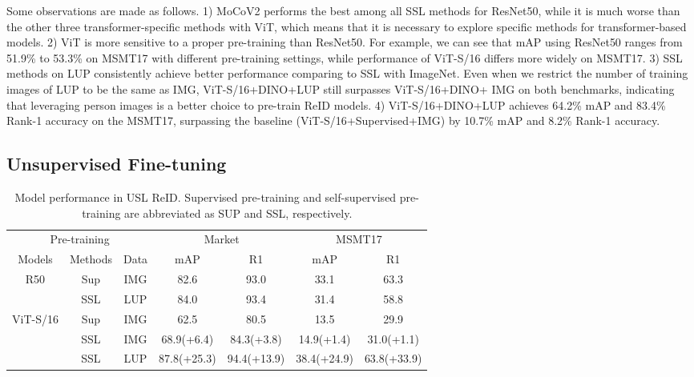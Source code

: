 \documentclass[10pt,twocolumn,letterpaper]{article}
\begin{document}
Some observations are made as follows. 1) MoCoV2 performs the best among all SSL methods for ResNet50, while it is much worse than the other three transformer-specific methods with ViT, which means that it is necessary to explore specific methods for transformer-based models. 2) ViT is more sensitive to a proper pre-training than ResNet50. For example, we can see that mAP using ResNet50 ranges from 51.9\% to 53.3\% on MSMT17 with different pre-training settings, while performance of ViT-S/16 differs more widely on MSMT17. 3) SSL methods on LUP consistently achieve better performance comparing to SSL with ImageNet. Even when we restrict the number of training images of LUP to be the same as IMG,  ViT-S/16+DINO+LUP still surpasses ViT-S/16+DINO+
IMG on both benchmarks, indicating that leveraging person images is a better choice to pre-train ReID models. 4) ViT-S/16+DINO+LUP achieves 64.2\% mAP and 83.4\% Rank-1 accuracy on the MSMT17, surpassing the baseline (ViT-S/16+Supervised+IMG) by 10.7\% mAP and 8.2\% Rank-1 accuracy.

\subsection{Unsupervised Fine-tuning}

\renewcommand{\multirowsetup}{\centering}
\begin{table}[htb]\footnotesize
    \begin{center}
    \setlength\tabcolsep{2pt}
    \begin{tabular}{ccc|cc|cc}
    \hline
     \multicolumn{3}{c|}{Pre-training}  & \multicolumn{2}{c|}{Market}  & \multicolumn{2}{c}{MSMT17}\\
    Models & Methods &Data & mAP & R1 & mAP & R1\\
    \hline
    \multirow{2}{*}{R50}& Sup &IMG &82.6 &93.0 &33.1 &63.3 \\
    & SSL &LUP &84.0 &93.4 &31.4 &58.8\\
    \hline
    \multirow{3}{*}{ViT-S/16}& Sup &IMG &62.5 &80.5 &13.5 &29.9 \\
    & SSL &IMG  &68.9{\color{gray}(+6.4)} &84.3{\color{gray}(+3.8)} &14.9{\color{gray}(+1.4)} &31.0{\color{gray}(+1.1)}\\
    & SSL &LUP &87.8{\color{gray}(+25.3)} &94.4{\color{gray}(+13.9)} &38.4{\color{gray}(+24.9)} &63.8{\color{gray}(+33.9)}\\
    \hline
    \end{tabular}
    \end{center}
    \vspace{-1em}
    \caption{\label{tab:usl} Model performance in USL ReID. Supervised pre-training and self-supervised pre-training are abbreviated as SUP and SSL, respectively. }
    \vspace{-1em}
\end{table}
\end{document}
